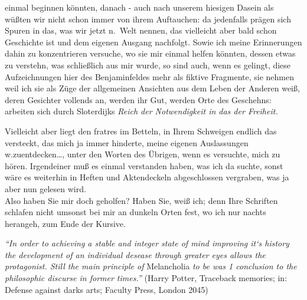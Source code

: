 \documentclass[
]{article}
\begin{document}
einmal beginnen könnten, danach - auch nach unserem hiesigen Dasein als
wüßten wir nicht schon immer von ihrem Auftauchen: da jedenfalls prägen
sich Spuren in das, was wir jetzt n.~Welt nennen, das vielleicht aber
bald schon Geschichte ist und dem eigenen Ausgang nachfolgt. Sowie ich
meine Erinnerungen dahin zu konzentrieren versuche, wo sie mir einmal
helfen könnten, dessen etwas zu verstehn, was schließlich aus mir wurde,
so sind auch, wenn es gelingt, diese Aufzeichnungen hier des
Benjaminfeldes mehr als fiktive Fragmente, sie nehmen weil ich sie als
Züge der allgemeinen Ansichten aus dem Leben der Anderen weiß, deren
Gesichter vollends an, werden ihr Gut, werden Orte des Geschehns:
arbeiten sich durch Sloterdijks \emph{Reich der Notwendigkeit in das der
Freiheit.}

Vielleicht aber liegt den fratres im Betteln, in Ihrem Schweigen endlich
das versteckt, das mich ja immer hinderte, meine eigenen Auslassungen
w.zuentdecken\ldots, unter den Worten des Übrigen, wenn es versuchte,
mich zu hören. Irgendeiner muß es einmal verstanden haben, was ich da
suchte, sonst wäre es weiterhin in Heften und Aktendeckeln abgeschlossen
vergraben, was ja aber nun gelesen wird.\\
Also haben Sie mir doch geholfen? Haben Sie, weiß ich; denn Ihre
Schriften schlafen nicht umsonst bei mir an dunkeln Orten fest, wo ich
nur nachts herangeh, zum Ende der Kursive.

\emph{``In order to achieving a stable and integer state of mind
improving it`s history the development of an individual desease through
greater eyes allows the protagonist. Still the main principle of}
Melancholia \emph{to be was 1 conclusion to the philosophic discurse in
former times.''} (Harry Potter, Traceback memories; in: Defense against
darks arts; Faculty Press, London 2045)
\end{document}
